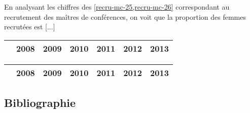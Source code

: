 \begin{bodycode}[listing options={morekeywords={[2]title,label},deletekeywords={[3]section}}]
En analysant les chiffres des \vref{recru-mc-25,recru-mc-26} correspondant au
recrutement des maîtres de conférences, on voit que la proportion des femmes
recrutées est [...]
%
\begin{gzttable*}[label=recru-mc-25,title=Recrutement des maîtres de
  conférences section 25]
  \begin{tabular}{|l|cccccc|}
    \hline
    & 2008 & 2009 & 2010 & 2011 & 2012 & 2013 \\ \hline
    [...]
  \end{tabular}
\end{gzttable*}
%
\begin{gzttable*}[label=recru-mc-26,title=Recrutement des maîtres de
  conférences section 26]
  \begin{tabular}{|l|cccccc|}
    \hline
    & 2008 & 2009 & 2010 & 2011 & 2012 & 2013 \\ \hline
    [...]
  \end{tabular}
\end{gzttable*}
\end{bodycode}

\subsection{Bibliographie}
\label{sec-bibliographie}

